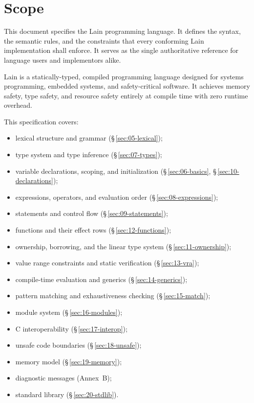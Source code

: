 \chapter{Scope}
\label{sec:scope}

\pnum
This document specifies the Lain programming language.  It defines the
syntax, the semantic rules, and the constraints that every conforming Lain
implementation shall enforce.  It serves as the single authoritative
reference for language users and implementors alike.

\pnum
Lain is a statically-typed, compiled programming language designed for
systems programming, embedded systems, and safety-critical software.  It
achieves memory safety, type safety, and resource safety entirely at compile
time with zero runtime overhead.

\pnum
This specification covers:

\begin{itemize}
  \item lexical structure and grammar (\S\,\ref{sec:05-lexical});
  \item type system and type inference (\S\,\ref{sec:07-types});
  \item variable declarations, scoping, and initialization
        (\S\,\ref{sec:06-basics}, \S\,\ref{sec:10-declarations});
  \item expressions, operators, and evaluation order
        (\S\,\ref{sec:08-expressions});
  \item statements and control flow (\S\,\ref{sec:09-statements});
  \item functions and their effect rows (\S\,\ref{sec:12-functions});
  \item ownership, borrowing, and the linear type system
        (\S\,\ref{sec:11-ownership});
  \item value range constraints and static verification
        (\S\,\ref{sec:13-vra});
  \item compile-time evaluation and generics (\S\,\ref{sec:14-generics});
  \item pattern matching and exhaustiveness checking
        (\S\,\ref{sec:15-match});
  \item module system (\S\,\ref{sec:16-modules});
  \item C interoperability (\S\,\ref{sec:17-interop});
  \item unsafe code boundaries (\S\,\ref{sec:18-unsafe});
  \item memory model (\S\,\ref{sec:19-memory});
  \item diagnostic messages (Annex~B);
  \item standard library (\S\,\ref{sec:20-stdlib}).
\end{itemize}

